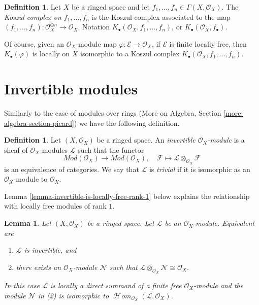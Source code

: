 \documentclass{stacks-project}
\theoremstyle{plain}
\newtheorem{lemma}[subsection]{Lemma}
\theoremstyle{definition}
\newtheorem{definition}[subsection]{Definition}
\theoremstyle{remark}
\numberwithin{equation}{subsection}
\def\SheafHom{\mathop{\mathcal{H}\!\mathit{om}}\nolimits}
\begin{document}
\begin{definition}
\label{definition-koszul-complex}
Let $X$ be a ringed space and let
$f_1, \ldots, f_n \in \Gamma(X, \mathcal{O}_X)$. The
{\it Koszul complex on $f_1, \ldots, f_n$} is the Koszul complex
associated to the map
$(f_1, \ldots, f_n) : \mathcal{O}_X^{\oplus n} \to \mathcal{O}_X$.
Notation $K_\bullet(\mathcal{O}_X, f_1, \ldots, f_n)$,
or $K_\bullet(\mathcal{O}_X, f_\bullet)$.
\end{definition}

\noindent
Of course, given an $\mathcal{O}_X$-module map
$\varphi : \mathcal{E} \to \mathcal{O}_X$,
if $\mathcal{E}$ is finite locally free, then
$K_\bullet(\varphi)$ is locally on $X$ isomorphic to a Koszul complex
$K_\bullet(\mathcal{O}_X, f_1, \ldots, f_n)$.



\section{Invertible modules}
\label{section-invertible}

\noindent
Similarly to the case of modules over rings
(More on Algebra, Section \ref{more-algebra-section-picard})
we have the following definition.

\begin{definition}
\label{definition-invertible}
Let $(X, \mathcal{O}_X)$ be a ringed space. An
{\it invertible $\mathcal{O}_X$-module} is a sheaf
of $\mathcal{O}_X$-modules $\mathcal{L}$ such that
the functor
$$
\textit{Mod}(\mathcal{O}_X) \longrightarrow \textit{Mod}(\mathcal{O}_X),\quad
\mathcal{F} \longmapsto \mathcal{L} \otimes_{\mathcal{O}_X} \mathcal{F}
$$
is an equivalence of categories. We say that $\mathcal{L}$ is
{\it trivial} if it is isomorphic as an $\mathcal{O}_X$-module
to $\mathcal{O}_X$.
\end{definition}

\noindent
Lemma \ref{lemma-invertible-is-locally-free-rank-1}
below explains the relationship with locally free modules
of rank $1$.

\begin{lemma}
\label{lemma-invertible}
Let $(X, \mathcal{O}_X)$ be a ringed space. Let $\mathcal{L}$
be an $\mathcal{O}_X$-module. Equivalent are
\begin{enumerate}
\item $\mathcal{L}$ is invertible, and
\item there exists an $\mathcal{O}_X$-module $\mathcal{N}$
such that
$\mathcal{L} \otimes_{\mathcal{O}_X} \mathcal{N} \cong \mathcal{O}_X$.
\end{enumerate}
In this case $\mathcal{L}$ is locally a direct summand of a finite free
$\mathcal{O}_X$-module and the module $\mathcal{N}$ in (2) is isomorphic to
$\SheafHom_{\mathcal{O}_X}(\mathcal{L}, \mathcal{O}_X)$.
\end{lemma}
\end{document}
